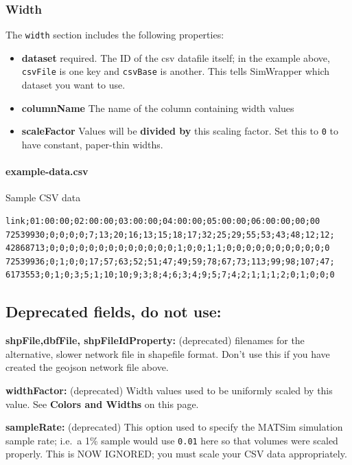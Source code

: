 \hypertarget{width}{%
\subsubsection{Width}\label{width}}

The \texttt{width} section includes the following properties:

\begin{itemize}
\tightlist
\item
  \textbf{dataset} required. The ID of the csv datafile itself; in the
  example above, \texttt{csvFile} is one key and \texttt{csvBase} is
  another. This tells SimWrapper which dataset you want to use.
\item
  \textbf{columnName} The name of the column containing width values
\item
  \textbf{scaleFactor} Values will be \textbf{divided by} this scaling
  factor. Set this to \texttt{0} to have constant, paper-thin widths.
\end{itemize}

\paragraph{example-data.csv} Sample CSV data

\begin{verbatim}
link;01:00:00;02:00:00;03:00:00;04:00:00;05:00:00;06:00:00;00;00
72539930;0;0;0;0;7;13;20;16;13;15;18;17;32;25;29;55;53;43;48;12;12;
42868713;0;0;0;0;0;0;0;0;0;0;0;0;0;1;0;0;1;1;0;0;0;0;0;0;0;0;0;0;0
72539936;0;1;0;0;17;57;63;52;51;47;49;59;78;67;73;113;99;98;107;47;
6173553;0;1;0;3;5;1;10;10;9;3;8;4;6;3;4;9;5;7;4;2;1;1;1;2;0;1;0;0;0
\end{verbatim}

\hypertarget{deprecated-fields-do-not-use}{%
\subsection{Deprecated fields, do not
use:}\label{deprecated-fields-do-not-use}}

\textbf{shpFile,dbfFile, shpFileIdProperty:} (deprecated) filenames for
the alternative, slower network file in shapefile format. Don't use this
if you have created the geojson network file above.

\textbf{widthFactor:} (deprecated) Width values used to be uniformly
scaled by this value. See \textbf{Colors and Widths} on this page.

\textbf{sampleRate:} (deprecated) This option used to specify the MATSim
simulation sample rate; i.e.~a 1\% sample would use \texttt{0.01} here
so that volumes were scaled properly. This is NOW IGNORED; you must
scale your CSV data appropriately.
